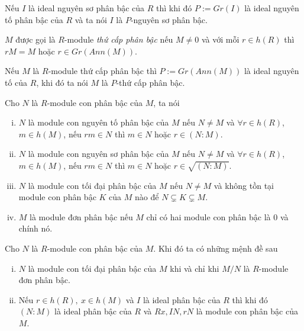 \begin{remark}
    Nếu $I$ là ideal nguyên sơ phân bậc của $R$ thì khi đó $P := Gr(I)$ là ideal nguyên tố phân bậc của $R$ và ta nói $I$ là $P$-nguyên sơ phân bậc.
\end{remark}

\begin{define}
    $M$ được gọi là $R$-module \textit{thứ cấp phân bậc} nếu $M \neq 0$ và với mỗi $r \in h(R)$ thì $rM = M$ hoặc $r \in Gr(Ann(M))$.
\end{define}

\begin{remark}
    Nếu $M$ là $R$-module thứ cấp phân bậc thì $P := Gr(Ann(M))$ là ideal nguyên tố của $R$, khi đó ta nói $M$ là $P$-thứ cấp phân bậc.
\end{remark}

\begin{define}
    Cho $N$ là $R$-module con phân bậc của $M$, ta nói
    \begin{enumerate}[(i)]
        \item $N$ là module con nguyên tố phân bậc của $M$ nếu $N \neq M$ và $\forall r \in h(R)$, $m \in h(M)$, nếu $rm \in N$ thì $m \in N$ hoặc $r \in (N:M)$.
        \item $N$ là module con nguyên sơ phân bậc của $M$ nếu $N \neq M$ và $\forall r \in h(R)$, $m \in h(M)$, nếu $rm \in N$ thì $m \in N$ hoặc $r \in \sqrt{(N:M)}$.
        \item $N$ là module con tối đại phân bậc của $M$ nếu $N \neq M$ và không tồn tại module con phân bậc $K$ của $M$ nào để $N \subsetneq K \subsetneq M$.
        \item $M$ là module đơn phân bậc nếu $M$ chỉ có hai module con phân bậc là $0$ và chính nó.
    \end{enumerate}
\end{define}

\begin{lemma}
    \label{lem1}
    Cho $N$ là $R$-module con phân bậc của $M$. Khi đó ta có những mệnh đề sau
    \begin{enumerate}[(i)]
        \item $N$ là module con tối đại phân bậc của $M$ khi và chỉ khi $M / N$ là $R$-module đơn phân bậc.
        \item Nếu $r \in h(R),\ x \in h(M)$ và $I$ là ideal phân bậc của $R$ thì khi đó $(N:M)$ là ideal phân bậc của $R$ và $Rx,IN,rN$ là module con phân bậc của $M$.
    \end{enumerate}
\end{lemma}


